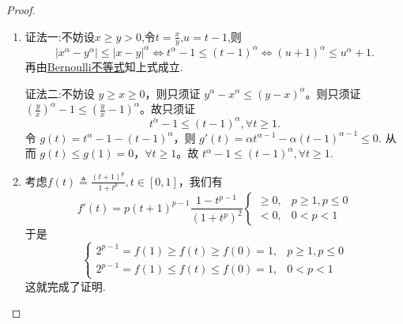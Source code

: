 \documentclass[../../main.tex]{subfiles}%
\begin{document}
\begin{proof}
\begin{enumerate}[(1)]
\item {\color{blue}证法一:}不妨设$x\geqslant y>0$,令$t=\frac{x}{y}$,$u=t-1$,则
\[
\left| x^{\alpha}-y^{\alpha} \right|\leqslant \left| x-y \right|^{\alpha}\Longleftrightarrow t^{\alpha}-1\leqslant \left( t-1 \right)^{\alpha}\Longleftrightarrow \left( u+1 \right)^{\alpha}\leqslant u^{\alpha}+1.
\]
再由\hyperref[theorem:Bernoulli不等式]{Bernoulli不等式}知上式成立.

{\color{blue}证法二:}不妨设 $y \geqslant x \geqslant 0$，则只须证 $y^{\alpha} - x^{\alpha} \leqslant \left( y - x \right)^{\alpha}$。则只须证 $\left( \frac{y}{x} \right)^{\alpha} - 1 \leqslant \left( \frac{y}{x} - 1 \right)^{\alpha}$。故只须证
\[
t^{\alpha} - 1 \leqslant \left( t - 1 \right)^{\alpha}, \forall t \geqslant 1.
\]
令 $g\left( t \right) = t^{\alpha} - 1 - \left( t - 1 \right)^{\alpha}$，则
\(
g'\left( t \right) = \alpha t^{\alpha - 1} - \alpha \left( t - 1 \right)^{\alpha - 1} \leqslant 0.
\)
从而 $g\left( t \right) \leqslant g\left( 1 \right) = 0$，$\forall t \geqslant 1$。故
\(
t^{\alpha} - 1 \leqslant \left( t - 1 \right)^{\alpha},\forall t \geqslant 1.
\)

\item 考虑\(f(t)\triangleq\frac{(t + 1)^p}{1 + t^p},t\in[0,1]\)，我们有
\[
f'(t)=p(t + 1)^{p - 1}\frac{1 - t^{p - 1}}{(1 + t^p)^2}
\begin{cases}
\geqslant0,& p\geqslant1,p\leqslant0\\
<0,& 0 < p < 1
\end{cases}
\]
于是
\[
\begin{cases}
2^{p - 1}=f(1)\geqslant f(t)\geqslant f(0)=1,& p\geqslant1,p\leqslant0\\
2^{p - 1}=f(1)\leqslant f(t)\leqslant f(0)=1,& 0 < p < 1
\end{cases}
\]
这就完成了证明.
\end{enumerate}
\end{proof}
\end{document}
